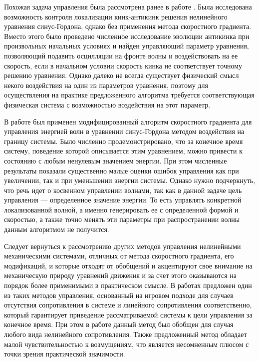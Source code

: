 Похожая задача управления была рассмотрена ранее в работе \cite{intro_bondar}. Была исследована возможность контроля локализации кинк-антикинк решения нелинейного уравнения синус-Гордона, однако без применения метода скоростного градиента. Вместо этого было проведено численное исследование эволюции антикинка при произвольных начальных условиях и найден управляющий параметр уравнения, позволяющий подавить осцилляции на фронте волны и воздействовать на ее скорость, если в начальном условии скорость кинка не соответствует точному решению уравнения. Однако далеко не всегда существует физический смысл некого воздействия на один из параметров уравнения, поэтому для осуществления на практике предложенного алгоритма требуется соответствующая физическая система с возможностью воздействия на этот параметр.

В работе \cite{dolgopolik2016boundary} был применен модифицированный алгоритм скоростного градиента для управления энергией волн в уравнении синус-Гордона методом воздействия на границу системы. Было численно продемонстрировано, что за конечное время систему, поведение которой описывается этим уравнением, можно привести к состоянию с любым ненулевым значением энергии. При этом численные результаты показали существенно малые оценки ошибок управления как при увеличении, так и при уменьшении энергии системы. Однако нужно подчеркнуть, что речь идет о косвенном управлении волнами, так как в данной задаче цель управления --- определенное значение энергии. То есть управлять конкретной локализованной волной, а именно генерировать ее с определенной формой и скоростью, а также точно менять эти параметры при распространении волны данным алгоритмом не получится.

Следует вернуться к рассмотрению других методов управления нелинейными механическими системами, отличных от метода скоростного градиента, его модификаций, и которые отходят от обобщений и акцентируют свое внимание на механическую природу уравнений движения и за счет этого оказываются на порядок более применимыми в практическом смысле.
В работах \cite{intro_chern13, intro_chern14} предложен один из таких методов управления, основанный на игровом подходе для случаев отсутствия сопротивления в системе и линейного сопротивления соответственно, который гарантирует приведение рассматриваемой системы к цели управления за конечное время. При этом в работе \cite{intro_chern15} данный метод был обобщен для случая любого вида нелинейного сопротивления. Также предложенный метод обладает малой чувствительностью к возмущениям, что является несомненным плюсом с точки зрения практической значимости.

